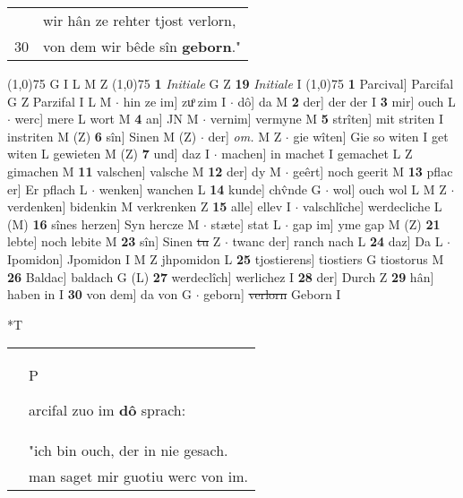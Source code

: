 \documentclass[8pt,a4paper,notitlepage]{article}
\begin{document}
\begin{table}[ht]
\begin{minipage}[t]{0.5\linewidth}
\begin{tabular}{rl}
 & wir hân ze rehter tjost verlorn,\\ 
30 & von dem wir bêde sîn \textbf{geborn}."\\ 
\end{tabular}
\scriptsize
\line(1,0){75} \newline
G I L M Z \newline
\line(1,0){75} \newline
\textbf{1} \textit{Initiale} G Z  \textbf{19} \textit{Initiale} I  \newline
\line(1,0){75} \newline
\textbf{1} Parcival] Parcifal G Z Parzifal I L M  $\cdot$ hin ze im] zuͦ zim I  $\cdot$ dô] da M \textbf{2} der] der der I \textbf{3} mir] ouch L  $\cdot$ werc] mere L wort M \textbf{4} an] JN M  $\cdot$ vernim] vermyne M \textbf{5} strîten] mit striten I instriten M (Z) \textbf{6} sîn] Sinen M (Z)  $\cdot$ der] \textit{om.} M Z  $\cdot$ gie wîten] Gie so witen I get witen L gewieten M (Z) \textbf{7} und] daz I  $\cdot$ machen] in machet I gemachet L Z gimachen M \textbf{11} valschen] valsche M \textbf{12} der] dy M  $\cdot$ geêrt] noch geerit M \textbf{13} pflac er] Er pflach L  $\cdot$ wenken] wanchen L \textbf{14} kunde] chv̂nde G  $\cdot$ wol] ouch wol L M Z  $\cdot$ verdenken] bidenkin M verkrenken Z \textbf{15} alle] ellev I  $\cdot$ valschlîche] werdecliche L (M) \textbf{16} sînes herzen] Syn hercze M  $\cdot$ stæte] stat L  $\cdot$ gap im] yme gap M (Z) \textbf{21} lebte] noch lebite M \textbf{23} sîn] Sinen \sout{tu} Z  $\cdot$ twanc der] ranch nach L \textbf{24} daz] Da L  $\cdot$ Ipomidon] Jpomidon I M Z jhpomidon L \textbf{25} tjostierens] tiostiers G tiostorus M \textbf{26} Baldac] baldach G (L) \textbf{27} werdeclîch] werlichez I \textbf{28} der] Durch Z \textbf{29} hân] haben in I \textbf{30} von dem] da von G  $\cdot$ geborn] \sout{verlorn} Geborn I \newline
\end{minipage}
\hspace{0.5cm}
\begin{minipage}[t]{0.5\linewidth}
\small
\begin{center}*T
\end{center}
\begin{tabular}{rl}
 & \begin{large}P\end{large}arcifal zuo im \textbf{dô} sprach:\\ 
 & "ich bin ouch, der in nie gesach.\\ 
 & man saget mir guotiu werc von im.\\ 

\end{tabular}
\end{minipage}
\end{table}
\end{document}
